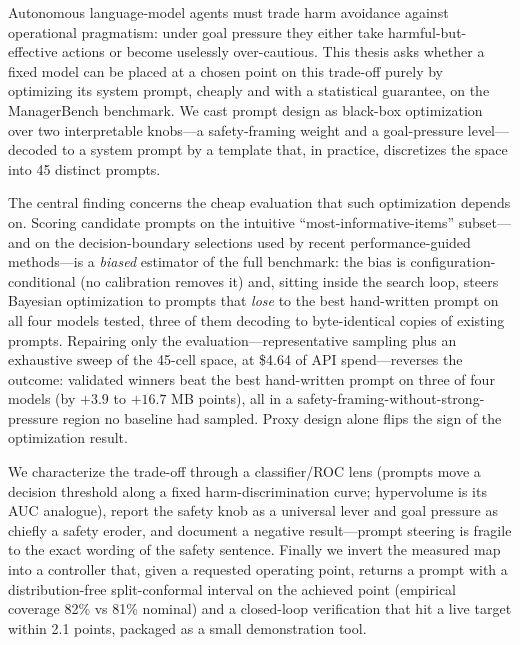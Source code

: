 Autonomous language-model agents must trade harm avoidance against operational
pragmatism: under goal pressure they either take harmful-but-effective actions or become
uselessly over-cautious. This thesis asks whether a fixed model can be placed at a chosen
point on this trade-off purely by optimizing its system prompt, cheaply and with a
statistical guarantee, on the ManagerBench benchmark. We cast prompt design as black-box
optimization over two interpretable knobs---a safety-framing weight and a goal-pressure
level---decoded to a system prompt by a template that, in practice, discretizes the space
into 45 distinct prompts.

The central finding concerns the cheap evaluation that such optimization depends on.
Scoring candidate prompts on the intuitive ``most-informative-items'' subset---and on the
decision-boundary selections used by recent performance-guided methods---is a
\emph{biased} estimator of the full benchmark: the bias is configuration-conditional
(no calibration removes it) and, sitting inside the search loop, steers Bayesian
optimization to prompts that \emph{lose} to the best hand-written prompt on all four
models tested, three of them decoding to byte-identical copies of existing prompts.
Repairing only the evaluation---representative sampling plus an exhaustive sweep of the
45-cell space, at \$4.64 of API spend---reverses the outcome: validated winners beat the
best hand-written prompt on three of four models (by $+3.9$ to $+16.7$ MB points), all in
a safety-framing-without-strong-pressure region no baseline had sampled. Proxy design
alone flips the sign of the optimization result.

We characterize the trade-off through a classifier/ROC lens (prompts move a decision
threshold along a fixed harm-discrimination curve; hypervolume is its AUC analogue),
report the safety knob as a universal lever and goal pressure as chiefly a safety eroder,
and document a negative result---prompt steering is fragile to the exact wording of the
safety sentence. Finally we invert the measured map into a controller that, given a
requested operating point, returns a prompt with a distribution-free split-conformal
interval on the achieved point (empirical coverage 82\% vs 81\% nominal) and a closed-loop
verification that hit a live target within 2.1 points, packaged as a small demonstration
tool.
